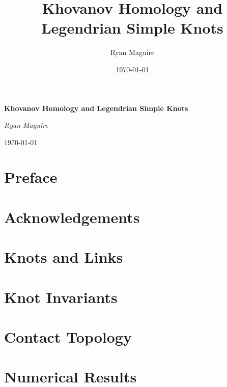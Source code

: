\documentclass{book}
\title{Khovanov Homology and Legendrian Simple Knots}
\author{Ryan Maguire}
\date{\today}
\theoremstyle{plain}
\theoremstyle{normal}
\begin{document}
    \begin{titlepage}
        \centering
        \LARGE{\bfseries{Khovanov Homology and Legendrian Simple Knots}}
        \par\vspace{3.5cm}
        \par\vspace{4cm}
        \Large{\itshape{Ryan Maguire}}
        \par\vspace{1.5ex}
        \normalsize{\today}
    \end{titlepage}
    \nopagecolor
    \tableofcontents
    \listoffigures
    \listoftables
    \clearpage
    \chapter*{Preface}
        
    \clearpage
    \chapter*{Acknowledgements}
    \clearpage
    \chapter{Knots and Links}
        
        
        
        
    \chapter{Knot Invariants}
        
        
        
        
        
    \chapter{Contact Topology}
        
        
        
        
    \chapter{Numerical Results}
        
        
        
        
        
    \clearpage
    
    
\end{document}
